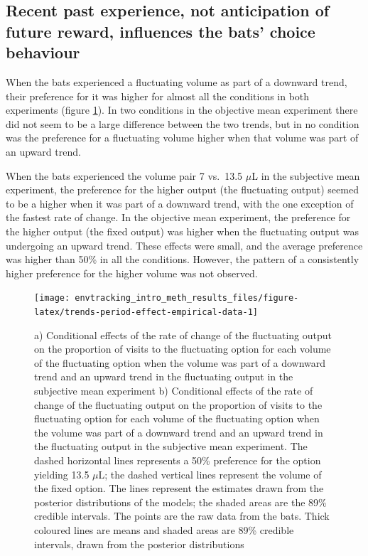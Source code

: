 \documentclass[
]{article}
\begin{document}
\hypertarget{recent-past-experience-not-anticipation-of-future-reward-influences-the-bats-choice-behaviour}{%
\subsection{Recent past experience, not anticipation of future reward, influences the bats' choice behaviour}\label{recent-past-experience-not-anticipation-of-future-reward-influences-the-bats-choice-behaviour}}

When the bats experienced a fluctuating volume as part of a downward trend, their preference for it was higher for almost all the conditions in both experiments (figure \ref{fig:trends-period-effect-empirical-data}). In two conditions in the objective mean experiment there did not seem to be a large difference between the two trends, but in no condition was the preference for a fluctuating volume higher when that volume was part of an upward trend.

When the bats experienced the volume pair 7 vs.~13.5 \(\mu\)L in the subjective mean experiment, the preference for the higher output (the fluctuating output) seemed to be a higher when it was part of a downward trend, with the one exception of the fastest rate of change. In the objective mean experiment, the preference for the higher output (the fixed output) was higher when the fluctuating output was undergoing an upward trend. These effects were small, and the average preference was higher than 50\% in all the conditions. However, the pattern of a consistently higher preference for the higher volume was not observed.



\begin{figure}[H]

{\centering \texttt{[image: envtracking\_intro\_meth\_results\_files/figure-latex/trends-period-effect-empirical-data-1]} 

}

\caption{a) Conditional effects of the rate of change of the fluctuating output on the proportion of visits to the fluctuating option for each volume of the fluctuating option when the volume was part of a downward trend and an upward trend in the fluctuating output in the subjective mean experiment b) Conditional effects of the rate of change of the fluctuating output on the proportion of visits to the fluctuating option for each volume of the fluctuating option when the volume was part of a downward trend and an upward trend in the fluctuating output in the subjective mean experiment. The dashed horizontal lines represents a 50\% preference for the option yielding 13.5 \(\mu\)L; the dashed vertical lines represent the volume of the fixed option. The lines represent the estimates drawn from the posterior distributions of the models; the shaded areas are the 89\% credible intervals. The points are the raw data from the bats. Thick coloured lines are means and shaded areas are 89\% credible intervals, drawn from the posterior distributions}\label{fig:trends-period-effect-empirical-data}
\end{figure}
\end{document}

